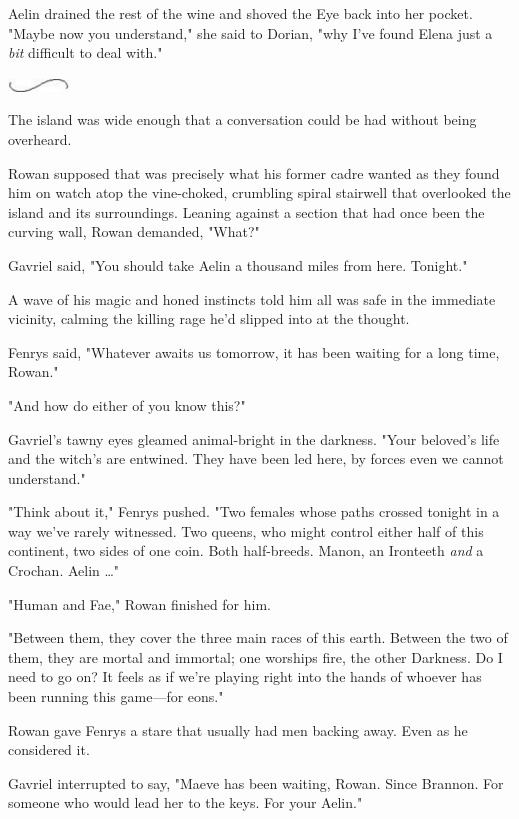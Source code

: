 Aelin drained the rest of the wine and shoved the Eye back into her pocket.
"Maybe now you understand," she said to Dorian, "why I've found Elena just a \emph{bit} difficult to deal with."

\begin{center}
	\includegraphics[width=0.65in,height=0.13in]{images/seperator}
\end{center}

The island was wide enough that a conversation could be had without being overheard.

Rowan supposed that was precisely what his former cadre wanted as they found him on watch atop the vine-choked, crumbling spiral stairwell that overlooked the island and its surroundings.
Leaning against a section that had once been the curving wall, Rowan demanded, "What?"

Gavriel said, "You should take Aelin a thousand miles from here.
Tonight."

A wave of his magic and honed instincts told him all was safe in the immediate vicinity, calming the killing rage he'd slipped into at the thought.

Fenrys said, "Whatever awaits us tomorrow, it has been waiting for a long time, Rowan."

"And how do either of you know this?"

Gavriel's tawny eyes gleamed animal-bright in the darkness.
"Your beloved's life and the witch's are entwined.
They have been led here, by forces even we cannot understand."

"Think about it," Fenrys pushed.
"Two females whose paths crossed tonight in a way we've rarely witnessed.
Two queens, who might control either half of this continent, two sides of one coin.
Both half-breeds.
Manon, an Ironteeth \emph{and} a Crochan.
Aelin \ldots"

"Human and Fae," Rowan finished for him.

"Between them, they cover the three main races of this earth.
Between the two of them, they are mortal and immortal; one worships fire, the other Darkness.
Do I need to go on?
It feels as if we're playing right into the hands of whoever has been running this game---for eons."

Rowan gave Fenrys a stare that usually had men backing away.
Even as he considered it.

Gavriel interrupted to say, "Maeve has been waiting, Rowan.
Since Brannon.
For someone who would lead her to the keys.
For your Aelin."

